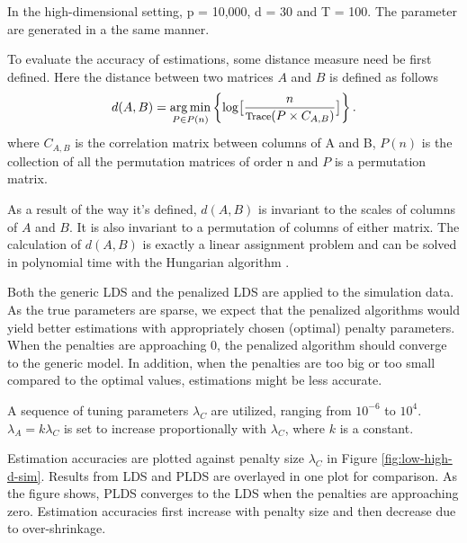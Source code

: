 \documentclass[fleqn]{article}
\let\oldref\ref
\renewcommand{\ref}[1]{(\oldref{#1})}
\DeclareMathOperator*{\argmin}{arg\,min}
\begin{document}
In the high-dimensional setting, p = 10,000, d = 30 and T = 100. The parameter are generated in a the same manner.

To evaluate the accuracy of estimations, some distance measure need be first defined. Here the distance between two matrices $A$ and $B$ is defined as follows
\begin{equation}\label{eq:distance}
d(A,B) = \argmin_{P\in P(n)}\left\{\log\bigl[\frac{n}{\text{\footnotesize Trace}(P\times C_{A,B})}\bigr]\right\}.
\end{equation}
where $C_{A,B}$ is the correlation matrix between columns of A and B, $P(n)$ is the collection of all the permutation matrices of order n and $P$ is a permutation matrix.

As a result of the way it's defined, $d(A,B)$ is invariant to the scales of columns of $A$ and $B$. It is also invariant to a permutation of columns of either matrix. The calculation of $d(A,B)$ is exactly a linear assignment problem and can be solved in polynomial time with the Hungarian algorithm \cite{kuhn1955hungarian}.


Both the generic LDS and the penalized LDS are applied to the simulation data. As the true parameters are sparse, we expect that the penalized algorithms would yield better estimations with appropriately chosen (optimal) penalty parameters. When the penalties are approaching 0, the penalized algorithm should converge to the generic model. In addition, when the penalties are too big or too small compared to the optimal values, estimations might be less accurate.

A sequence of tuning parameters $\lambda_C$ are utilized, ranging from $10^{-6}$ to $10^4$. $\lambda_A = k \lambda_C$ is set to increase proportionally with $\lambda_C$, where $k$ is a constant.

Estimation accuracies are plotted against penalty size $\lambda_C$ in Figure \oldref{fig:low-high-d-sim}. Results from LDS and PLDS are overlayed in one plot for comparison. As the figure shows, PLDS converges to the LDS when the penalties are approaching zero. Estimation accuracies first increase with penalty size and then decrease due to over-shrinkage.
\end{document}
